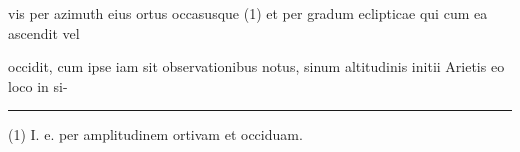 \documentclass[11pt]{article}
\begin{document}
\noindent\hypertarget{AB01-PDF0124-body-L036}{}vis per azimuth eius ortus occasusque (1) et per gradum eclipticae qui cum ea ascendit vel\strut\par
\noindent\hypertarget{AB01-PDF0124-body-L037}{}occidit, cum ipse iam sit observationibus notus, sinum altitudinis initii Arietis eo loco in si-\strut\par
\vspace{5mm}\hrule\vspace{2mm}
{\fontsize{9.2}{11.2}\selectfont
\noindent\hypertarget{AB01-PDF0124-notes_full-L001}{}(1) I. e. per amplitudinem ortivam et occiduam.\strut\par
}


\providecommand{\BoundedLine}[2]{\noindent\hypertarget{#1}{}#2\strut\par}
\end{document}

